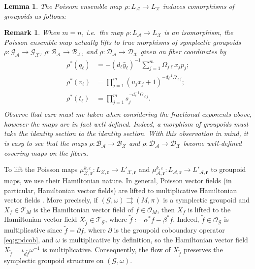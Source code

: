 \documentclass{amsart}
\newtheorem{lemma}[theorem]{Lemma}
\newtheorem{remark}[theorem]{Remark}
\numberwithin{equation}{section}
\newcommand{\bfr}{{\boldsymbol{r}}}
\newcommand{\cA}{\mathcal{A}}
\newcommand{\cB}{\mathcal{B}}
\newcommand{\cD}{\mathcal{D}}
\newcommand{\cG}{\mathcal{G}}
\newcommand{\cO}{\mathcal{O}}
\newcommand{\cT}{\mathcal{T}}
\newcommand{\cX}{\mathcal{X}}
\newcommand{\CC}{\mathbb{C}}
\newcommand{\RR}{\mathbb{R}}
\newcommand{\rra}{\rightrightarrows}
\begin{document}
\begin{lemma}
  The Poisson ensemble map $\rho:L_\cA\to L_\cX$ induces comorphisms of groupoids as follows:
\end{lemma}
\begin{remark}
  \label{rmk:source-connected lift}
  When $m=n$, i.e.\ the map $\rho:L_\cA\to L_\cX$ is an isomorphism, the Poisson ensemble map actually lifts to true morphisms of symplectic groupoids $\rho:\cG_\cA\to\cG_\cX$, $\rho:\cB_\cA\to\cB_\cX$, and $\rho:\cD_\cA\to\cD_\cX$ given on fiber coordinates by 
  \begin{align*}
    \rho^*(q_\ell)&=-(d_\ell\hat y_\ell)^{-1}\sum\limits_{j=1}^m\Omega_{j\ell}x_jp_j;\\
    \rho^*(v_\ell)&=\prod\limits_{j=1}^m (u_j x_j + 1)^{-d_\ell^{-1}\Omega_{\ell j}};\\
    \rho^*(t_\ell)&=\prod\limits_{j=1}^m s_j^{-d_\ell^{-1}\Omega_{\ell j}}.\\
  \end{align*}
  Observe that care must me taken when considering the fractional exponents above, however the maps are in fact well defined.
  Indeed, a morphism of groupoids must take the identity section to the identity section.
  With this observation in mind, it is easy to see that the maps $\rho:\cB_\cA\to\cB_\cX$ and $\rho:\cD_\cA\to\cD_\cX$ become well-defined covering maps on the fibers.
\end{remark}

To lift the Poisson maps $\mu_{\cX,\bfr}^{k,\varepsilon}:L_{\cX,\bfr}\to L'_{\cX,\bfr}$ and $\mu_{\cA,\bfr}^{k,\varepsilon}:L_{\cA,\bfr}\to L'_{\cA,\bfr}$ to groupoid maps, we use their Hamiltonian nature.
In general, Poisson vector fields (in particular, Hamiltonian vector fields) are lifted to multiplicative Hamiltonian vector fields \cite{MR2504211}.
More precisely, if $(\cG, \omega) \rra (M, \pi)$ is a symplectic groupoid and $X_f \in \cT_M$ is the Hamiltonian vector field of $f \in \cO_M$, then $X_f$ is lifted to the Hamiltonian vector field $X_{\tilde{f}} \in \cT_\cG$, where $\tilde{f} := \alpha^*f - \beta^*f$.
Indeed, $\tilde{f} \in \cO_\cG$ is multiplicative since $\tilde{f} = \partial f$, where $\partial$ is the groupoid coboundary operator \eqref{eq:gpdcob}, and $\omega$ is multiplicative by definition, so the Hamiltonian vector field $X_{\tilde{f}} = \iota_{d\tilde{f}}\omega^{-1}$ is multiplicative.
Consequently, the flow of $X_{\tilde{f}}$ preserves the symplectic groupoid structure on $(\cG,\omega)$.
\end{document}
